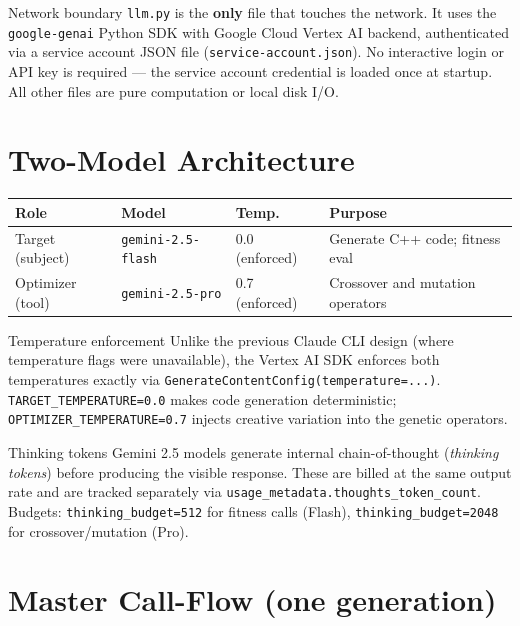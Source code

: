 \documentclass[11pt,a4paper]{report}
\newcommand{\fn}[1]{\texttt{#1}}
\newcommand{\pyf}[1]{\texttt{#1}}
\begin{document}
\begin{concept}{Network boundary}
\pyf{llm.py} is the \textbf{only} file that touches the network.  It uses the
\fn{google-genai} Python SDK with Google Cloud Vertex AI backend, authenticated via a
service account JSON file (\fn{service-account.json}).  No interactive login or API key
is required --- the service account credential is loaded once at startup.
All other files are pure computation or local disk I/O.
\end{concept}

\section{Two-Model Architecture}

\begin{center}
\begin{tabular}{@{}llll@{}}
\toprule
\textbf{Role} & \textbf{Model} & \textbf{Temp.} & \textbf{Purpose} \\
\midrule
Target (subject)    & \fn{gemini-2.5-flash} & 0.0 (enforced) & Generate C++ code; fitness eval \\
Optimizer (tool)    & \fn{gemini-2.5-pro}   & 0.7 (enforced) & Crossover and mutation operators \\
\bottomrule
\end{tabular}
\end{center}

\begin{concept}{Temperature enforcement}
Unlike the previous Claude CLI design (where temperature flags were unavailable),
the Vertex AI SDK enforces both temperatures exactly via
\fn{GenerateContentConfig(temperature=...)}.  \fn{TARGET\_TEMPERATURE=0.0} makes
code generation deterministic; \fn{OPTIMIZER\_TEMPERATURE=0.7} injects creative
variation into the genetic operators.
\end{concept}

\begin{concept}{Thinking tokens}
Gemini 2.5 models generate internal chain-of-thought (\emph{thinking tokens}) before
producing the visible response.  These are billed at the same output rate and are
tracked separately via \fn{usage\_metadata.thoughts\_token\_count}.  Budgets:
\fn{thinking\_budget=512} for fitness calls (Flash), \fn{thinking\_budget=2048} for
crossover/mutation (Pro).
\end{concept}

\section{Master Call-Flow (one generation)}
\end{document}
